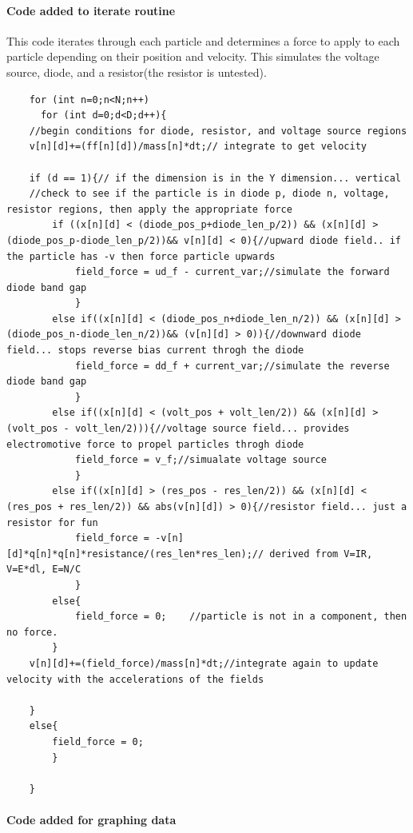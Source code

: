 \documentclass[a4paper]{article}
\begin{document}
\paragraph{Code added to iterate routine}

This code iterates through each particle and determines a force to apply to each particle depending on their position and velocity. This simulates the voltage source, diode, and a resistor(the resistor is untested).

\begin{verbatim}
    for (int n=0;n<N;n++)
      for (int d=0;d<D;d++){
	//begin conditions for diode, resistor, and voltage source regions
	v[n][d]+=(ff[n][d])/mass[n]*dt;// integrate to get velocity
	
	if (d == 1){// if the dimension is in the Y dimension... vertical
	//check to see if the particle is in diode p, diode n, voltage, resistor regions, then apply the appropriate force
		if ((x[n][d] < (diode_pos_p+diode_len_p/2)) && (x[n][d] > (diode_pos_p-diode_len_p/2))&& v[n][d] < 0){//upward diode field.. if the particle has -v then force particle upwards
			field_force = ud_f - current_var;//simulate the forward diode band gap
			}
		else if((x[n][d] < (diode_pos_n+diode_len_n/2)) && (x[n][d] > (diode_pos_n-diode_len_n/2))&& (v[n][d] > 0)){//downward diode field... stops reverse bias current throgh the diode
			field_force = dd_f + current_var;//simulate the reverse diode band gap
			}
		else if((x[n][d] < (volt_pos + volt_len/2)) && (x[n][d] > (volt_pos - volt_len/2))){//voltage source field... provides electromotive force to propel particles throgh diode
			field_force = v_f;//simualate voltage source
			}
		else if((x[n][d] > (res_pos - res_len/2)) && (x[n][d] < (res_pos + res_len/2)) && abs(v[n][d]) > 0){//resistor field... just a resistor for fun
			field_force = -v[n][d]*q[n]*q[n]*resistance/(res_len*res_len);// derived from V=IR, V=E*dl, E=N/C
			}
		else{
			field_force = 0;	//particle is not in a component, then no force.	
		}
	v[n][d]+=(field_force)/mass[n]*dt;//integrate again to update velocity with the accelerations of the fields
	
	}
	else{
		field_force = 0;		
		}

	}
\end{verbatim}



\paragraph{Code added for graphing data}
\end{document}

